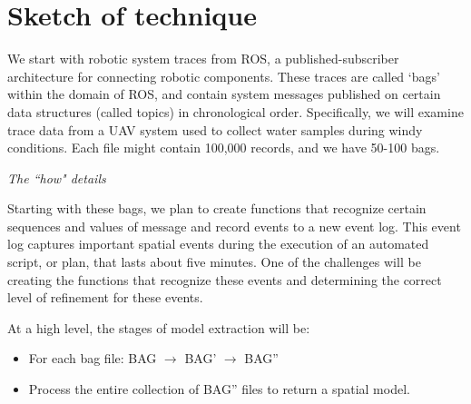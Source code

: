 \section{Sketch of technique}

We start with robotic system traces from ROS, a published-subscriber architecture for connecting robotic components.  
These traces are called `bags' within the domain of ROS, and contain system messages published on certain data structures (called topics) in chronological order.
Specifically, we will examine trace data from a UAV system used to collect water samples during windy conditions.
Each file might contain 100,000 records, and we have 50-100 bags.

\emph{The ``how" details}

Starting with these bags, we plan to create functions that recognize certain sequences and values of message and record events to a new event log.
This event log captures important spatial events during the execution of an automated script, or plan, that lasts about five minutes.
One of the challenges will be creating the functions that recognize these events and determining the correct level of refinement for these events.

At a high level, the stages of model extraction will be:

\begin{itemize}
  \item For each bag file: BAG $\rightarrow$ BAG' $\rightarrow$ BAG'' 

  \item Process the entire collection of BAG'' files to return a spatial model.
\end{itemize}


